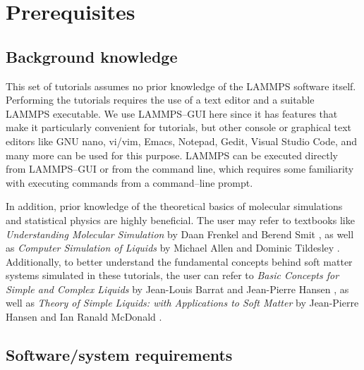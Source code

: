 \documentclass[9pt,tutorial]{livecoms}
\begin{document}
\section{Prerequisites}


\subsection{Background knowledge}

This set of tutorials assumes no prior knowledge of the LAMMPS software
itself.  Performing the tutorials requires the use of a text editor and
a suitable LAMMPS executable.  We use LAMMPS--GUI \cite{lammps_gui_docs}
here since it has features that make it particularly convenient for
tutorials, but other console or graphical text editors like GNU nano,
vi/vim, Emacs, Notepad, Gedit, Visual Studio Code, and many more can be
used for this purpose.  LAMMPS can be executed directly from LAMMPS--GUI
or from the command line, which requires some familiarity with executing
commands from a command--line prompt.

In addition, prior knowledge of the theoretical basics of molecular
simulations and statistical physics are highly beneficial.  The user may
refer to textbooks like \textit{Understanding Molecular Simulation} by
Daan Frenkel and Berend Smit \cite{frenkel2023understanding}, as well as
\textit{Computer Simulation of Liquids} by Michael Allen and Dominic
Tildesley \cite{allen2017computer}.  Additionally, to better understand
the fundamental concepts behind soft matter systems simulated in these
tutorials, the user can refer to \textit{Basic Concepts for Simple and
  Complex Liquids} by Jean-Louis Barrat and Jean-Pierre Hansen
\cite{barrat2003basic}, as well as \textit{Theory of Simple Liquids:
  with Applications to Soft Matter} by Jean-Pierre Hansen and Ian Ranald
McDonald \cite{hansen2013theory}.

\subsection{Software/system requirements}
\end{document}
